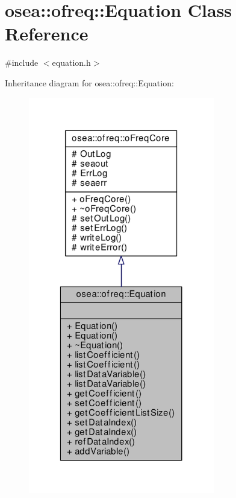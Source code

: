 \hypertarget{classosea_1_1ofreq_1_1_equation}{\section{osea\-:\-:ofreq\-:\-:Equation Class Reference}
\label{classosea_1_1ofreq_1_1_equation}
}


{\ttfamily \#include $<$equation.\-h$>$}



Inheritance diagram for osea\-:\-:ofreq\-:\-:Equation\-:
\nopagebreak
\begin{figure}[H]
\begin{center}
\leavevmode
\includegraphics[width=230pt]{classosea_1_1ofreq_1_1_equation__inherit__graph}
\end{center}
\end{figure}
